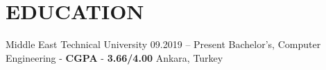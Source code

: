 \section{EDUCATION}

\resumeSubHeadingListStart
  
\resumeSubheading
  {Middle East Technical University}
  {09.2019 -- Present}
  {Bachelor's, Computer Engineering - \textbf{CGPA} - \textbf{3.66/4.00}}
  {Ankara, Turkey}
    \resumeItemListStart
    \resumeItemListEnd
\resumeSubHeadingListEnd
